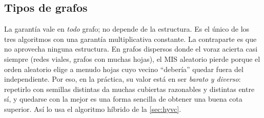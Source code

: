 \subsection{Tipos de grafos}
La garantía vale en \emph{todo} grafo; no depende de la estructura. Es el único de los tres algoritmos con una garantía multiplicativa constante. La contraparte es que no aprovecha ninguna estructura. En grafos dispersos donde el voraz acierta casi siempre (redes viales, grafos con muchas hojas), el MIS aleatorio pierde porque el orden aleatorio elige a menudo hojas cuyo vecino ``debería'' quedar fuera del independiente. Por eso, en la práctica, su valor está en ser \emph{barato y diverso}: repetirlo con semillas distintas da muchas cubiertas razonables y distintas entre sí, y quedarse con la mejor es una forma sencilla de obtener una buena cota superior. Así lo usa el algoritmo híbrido de la \cref{sec:hyvc}.
